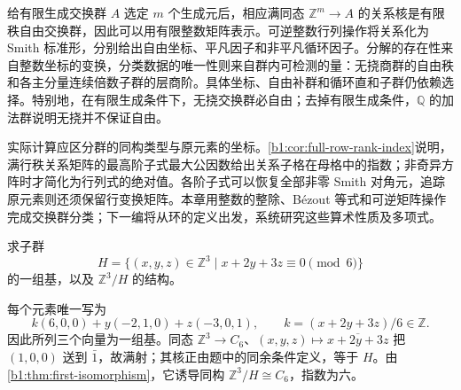 




\begin{chaptersummary}
	给有限生成交换群 \(A\) 选定 \(m\) 个生成元后，相应满同态 \(\mathbb Z^m\to A\) 的关系核是有限秩自由交换群，因此可以用有限整数矩阵表示。可逆整数行列操作将关系化为 Smith 标准形，分别给出自由坐标、平凡因子和非平凡循环因子。分解的存在性来自整数坐标的变换，分类数据的唯一性则来自群内可检测的量：无挠商群的自由秩和各主分量连续倍数子群的层商阶。具体坐标、自由补群和循环直和子群仍依赖选择。特别地，在有限生成条件下，无挠交换群必自由；去掉有限生成条件，\(\mathbb Q\) 的加法群说明无挠并不保证自由。

	\ProseParagraphBreak
	实际计算应区分群的同构类型与原元素的坐标。\cref{b1:cor:full-row-rank-index}说明，满行秩关系矩阵的最高阶子式最大公因数给出关系子格在母格中的指数；非奇异方阵时才简化为行列式的绝对值。各阶子式可以恢复全部非零 Smith 对角元，追踪原元素则还须保留行变换矩阵。本章用整数的整除、Bézout 等式和可逆矩阵操作完成交换群分类；下一编将从环的定义出发，系统研究这些算术性质及多项式。
\end{chaptersummary}

\BookExercises

\begin{exercise}\label{b1:ex:09-congruence-lattice}
	求子群
	\[
		H=\bigl\{(x,y,z)\in\mathbb Z^3\mid x+2y+3z\equiv0\pmod6\bigr\}
	\]
	的一组基，以及 \(\mathbb Z^3/H\) 的结构。
\end{exercise}
\begin{solution}
	每个元素唯一写为
	\[
		k(6,0,0)+y(-2,1,0)+z(-3,0,1), \qquad k=(x+2y+3z)/6\in\mathbb Z.
	\]
	因此所列三个向量为一组基。同态 \(\mathbb Z^3\to C_6\)、\((x,y,z)\mapsto\overline{x+2y+3z}\) 把 \((1,0,0)\) 送到 \(\bar1\)，故满射；其核正由题中的同余条件定义，等于 \(H\)。由\cref{b1:thm:first-isomorphism}，它诱导同构 \(\mathbb Z^3/H\cong C_6\)，指数为六。
\end{solution}

